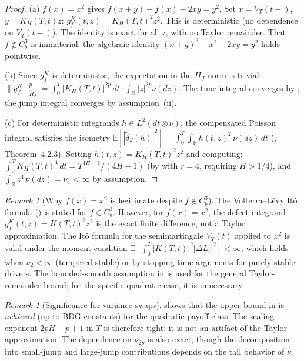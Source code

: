 \documentclass[11pt,a4paper]{article}
\theoremstyle{plain}
\theoremstyle{definition}
\theoremstyle{remark}
\newtheorem{remark}[theorem]{Remark}
\newcommand{\E}{\mathbb{E}}
\newcommand{\R}{\mathbb{R}}
\begin{document}
\begin{proof}
(a) $f(x) = x^2$ gives $f(x + y) - f(x) - 2xy = y^2$.
Set $x = V_T(t\!-\!)$, $y = K_H(T,t)z$:
$g_f^K(t,z) = K_H(T,t)^2 z^2$.  This is deterministic
(no dependence on $V_T(t\!-\!)$).  The identity is exact for
all $z$, with no Taylor remainder.  That $f \notin C_b^3$ is
immaterial: the algebraic identity $(x+y)^2 - x^2 - 2xy = y^2$
holds pointwise.

(b) Since $g_f^K$ is deterministic, the expectation in
the $\widetilde{H}_J$-norm is trivial:
$\|g_f^K\|_{\widetilde{H}_J}^p
= \int_0^T |K_H(T,t)|^{2p}\,dt \cdot \int_\R|z|^{2p}\nu(dz)$.
The time integral converges by ; the jump integral
converges by assumption~(ii).

(c) For deterministic integrands $h \in L^2(dt \otimes \nu)$,
the compensated Poisson integral satisfies the isometry
$\E[|\widetilde{\delta}_J(h)|^2]
= \int_0^T\!\int_\R h(t,z)^2\,\nu(dz)\,dt$
(\cite{Applebaum2009}, Theorem~4.2.3).  Setting
$h(t,z) = K_H(T,t)^2 z^2$ and computing:
$\int_0^T K_H(T,t)^4\,dt = T^{4H-1}/(4H-1)$ (by
 with $r = 4$, requiring $H > 1/4$),
and $\int_\R z^4\,\nu(dz) = \nu_4 < \infty$ by assumption.
\end{proof}

\begin{remark}[Why $f(x)=x^2$ is legitimate despite $f \notin C_b^3$]
\label{rem:quadratic-legitimate}
The Volterra--L\'evy It\^o formula () is
stated for $f \in C_b^3$.  However, for $f(x) = x^2$, the
defect integrand $g_f^K(t,z) = K(T,t)^2 z^2$ is the exact
finite difference, not a Taylor approximation.  The It\^o
formula for the semimartingale $V_T(t)$ applied to $x^2$
is valid under the moment condition
$\E[\int_0^T |K(T,t)|^2|\Delta L_t|^2] < \infty$,
which holds when $\nu_2 < \infty$ (tempered stable) or
by stopping time arguments for purely stable drivers.
The bounded-smooth assumption in  is
used for the general Taylor-remainder bound; for the
specific quadratic case, it is unnecessary.
\end{remark}

\begin{remark}[Significance for variance swaps]
\label{rem:var-swap-sharpness}
 shows that the
upper bound in  is \emph{achieved} (up
to BDG constants) for the quadratic payoff class.  The
scaling exponent $2pH - p + 1$ in $T$ is therefore tight:
it is not an artifact of the Taylor approximation.
The dependence on $\nu_{2p}$ is also exact, though
the decomposition into small-jump and large-jump
contributions depends on the tail behavior of $\nu$.
\end{remark}
\end{document}
